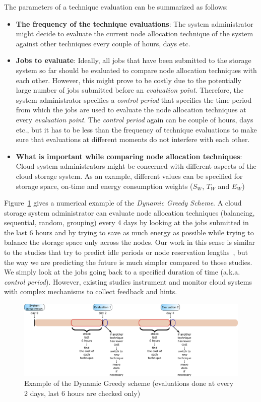 The parameters of a technique evaluation can be summarized as follows:
\begin{itemize}
\item \textbf{The frequency of the technique evaluations}: The system administrator might decide to
evaluate the current node allocation technique of the system against other techniques every couple of
hours, days etc.
\item \textbf{Jobs to evaluate}: Ideally, all jobs that have been submitted to the storage system so far
should be evaluated to compare node allocation techniques with each other. However, this might prove to be costly due
to the potentially large number of jobs submitted before an \textit{evaluation point}. Therefore, the system
administrator specifies a \textit{control period} that specifies the
time period from which the jobs are used to evaluate the node
allocation techniques at every \textit{evaluation point}.
The \textit{control period} again can be couple of hours, days etc., but it has to be less than the frequency of
technique evaluations to make sure that evaluations at different moments do not interfere with each other.
\item \textbf{What is important while comparing node allocation techniques}: Cloud system administrators might be
concerned with different aspects of the cloud storage system. As an example, different values can be specified for
storage space, on-time and energy consumption weights ($S_W$, $T_W$ and $E_W$)
\end{itemize}

Figure~\ref{greedy_examples} gives a numerical example of
the \textit{Dynamic Greedy Scheme}.
A cloud storage system administrator can evaluate node allocation techniques (balancing, sequential, random,
grouping) every 4 days by looking at the jobs submitted in the last 6 hours and by trying to save as much energy
as possible while trying to balance the storage space only across the nodes. Our work in this sense is similar
to the studies that try to predict idle periods or node reservation lengths~\cite{4724317, Riska:2010:FRE:1710115.1710124},
but the way we are predicting the future is much simpler compared to those studies. We simply look at the jobs
going back to a specified duration of time (a.k.a. \textit{control period}). However, existing studies instrument
and monitor cloud systems with complex mechanisms to collect feedback and hints.

\begin{figure}[!htbp]
\centering
\includegraphics[width=\columnwidth,keepaspectratio]{FIG3.pdf}
\caption{Example of the Dynamic Greedy scheme (evaluations done at every 2 days, last 6 hours are checked only)}
\label{greedy_examples}
\end{figure}

